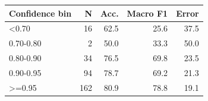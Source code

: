 \begin{tabular}{lrrrr}
\toprule
\textbf{Confidence bin} & \textbf{N} & \textbf{Acc.} & \textbf{Macro F1} & \textbf{Error} \\
\midrule
<0.70 & 16 & 62.5 & 25.6 & 37.5 \\
0.70-0.80 & 2 & 50.0 & 33.3 & 50.0 \\
0.80-0.90 & 34 & 76.5 & 69.8 & 23.5 \\
0.90-0.95 & 94 & 78.7 & 69.2 & 21.3 \\
>=0.95 & 162 & 80.9 & 78.8 & 19.1 \\
\bottomrule
\end{tabular}
